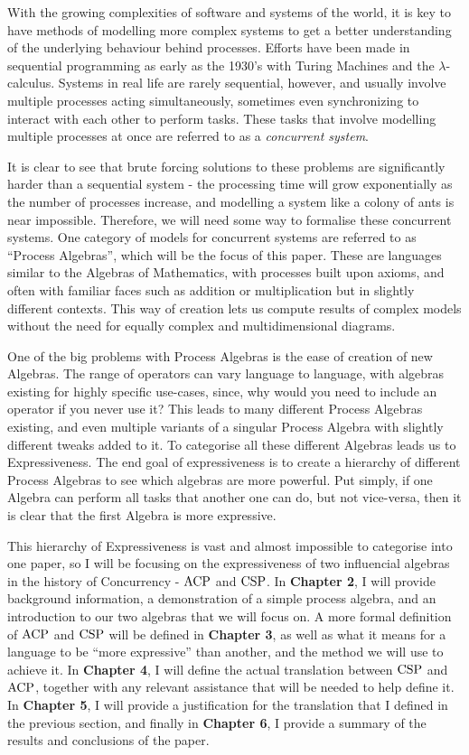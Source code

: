 \documentclass[../hons_project.tex]{subfiles}
\begin{document}
With the growing complexities of software and systems of the world, it is key to have methods of modelling more complex systems to get a better understanding of the underlying behaviour behind processes. Efforts have been made in sequential programming as early as the 1930's with Turing Machines and the $\lambda$-calculus. Systems in real life are rarely sequential, however, and usually involve multiple processes acting simultaneously, sometimes even synchronizing to interact with each other to perform tasks. These tasks that involve modelling multiple processes at once are referred to as a \textit{ concurrent system}. 

It is clear to see that brute forcing solutions to these problems are significantly harder than a sequential system - the processing time will grow exponentially as the number of processes increase, and modelling a system like a colony of ants is near impossible. Therefore, we will need some way to formalise these concurrent systems. One category of models for concurrent systems are referred to as ``Process Algebras'', which will be the focus of this paper. These are languages similar to the Algebras of Mathematics, with processes built upon axioms, and often with familiar faces such as addition or multiplication but in slightly different contexts. This way of creation lets us compute results of complex models without the need for equally complex and multidimensional diagrams.

One of the big problems with Process Algebras is the ease of creation of new Algebras. The range of operators can vary language to language, with algebras existing for highly specific use-cases, since, why would you need to include an operator if you never use it? This leads to many different Process Algebras existing, and even multiple variants of a singular Process Algebra with slightly different tweaks added to it. To categorise all these different Algebras leads us to Expressiveness. The end goal of expressiveness is to create a hierarchy of different Process Algebras to see which algebras are more powerful. Put simply, if one Algebra can perform all tasks that another one can do, but not vice-versa, then it is clear that the first Algebra is more expressive.

This hierarchy of Expressiveness is vast and almost impossible to categorise into one paper, so I will be focusing on the expressiveness of two influencial algebras in the history of Concurrency - $\mathrm{ACP}$ and $\mathrm{CSP}$. In \textbf{Chapter 2}, I will provide background information, a demonstration of a simple process algebra, and an introduction to our two algebras that we will focus on. A more formal definition of $\mathrm{ACP}$ and $\mathrm{CSP}$ will be defined in \textbf{Chapter 3}, as well as what it means for a language to be ``more expressive'' than another, and the method we will use to achieve it. In \textbf{Chapter 4}, I will define the actual translation between $\mathrm{CSP}$ and $\mathrm{ACP}$, together with any relevant assistance that will be needed to help define it. In \textbf{Chapter 5}, I will provide a justification for the translation that I defined in the previous section, and finally in \textbf{Chapter 6}, I provide a summary of the results and conclusions of the paper.
\end{document}
